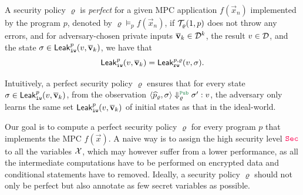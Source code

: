%
%


\begin{definition}
A security policy $\varrho$ is \emph{perfect} for a given MPC application $f(\vec{x}_n)$ implemented by the program $p$, denoted by $\varrho\models_p f(\vec{x}_n)$,
if $\mathcal{T}_\varrho(1,p)$ does not throw any errors, and for adversary-chosen private inputs $\overline{\bf{v}}_k\in\mathcal{D}^k$, the result $v\in\mathcal{D}$,
and the state $\sigma\in{\sf Leak}_{\tt iw}^p(v,\overline{\bf{v}}_k)$,
we have  that \[{\sf Leak}_{\tt iw}^p(v,\overline{\bf{v}}_k)={\sf Leak}_{\tt rw}^{p,\varrho}(v,\sigma).\]
%
\end{definition}
%
Intuitively, a perfect security policy $\varrho$ ensures that
for every state $\sigma\in{\sf Leak}_{\tt iw}^p(v,\overline{\bf{v}}_k)$,
from the observation $\MPCAngle{\widehat{p}_\varrho,\sigma}\Downarrow_\varrho^{\Pub} \sigma':v$,
the adversary only learns the same set
${\sf Leak}_{\tt iw}^p(v,\overline{\bf{v}}_k)$ of initial states as that in the ideal-world.

Our goal is to compute a perfect security policy $\varrho$ for every program $p$ that implements
the MPC $f(\vec{x})$. A naive way %
is to assign the high security level
$\Sec$ to all the variables $\mathcal{X}$, which  %
may however suffer from a lower performance,
as all the intermediate computations have to be performed on encrypted data
and conditional statements have to removed.
Ideally, a security policy $\varrho$ should not only be perfect but also annotate as few secret variables as possible.


